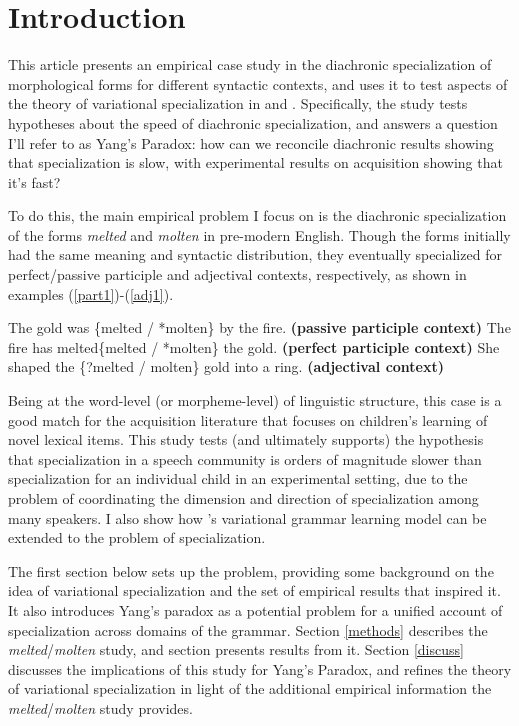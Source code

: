 \documentclass{artikel3}
\begin{document}
\section{Introduction}
\label{intro}

This article presents an empirical case study in the diachronic specialization of morphological forms for different syntactic contexts, and uses it to test aspects of the theory of variational specialization in \citet{wallenberg2016} and \citet{fruehwaldwallenberginprep}. Specifically, the study tests hypotheses about the speed of diachronic specialization, and answers a question I'll refer to as Yang's Paradox: how can we reconcile diachronic results showing that specialization is slow, with experimental results on acquisition showing that it's fast?

To do this, the main empirical problem I focus on is the diachronic specialization of the forms \textsl{melted} and \textsl{molten} in pre-modern English. Though the forms initially had the same meaning and syntactic distribution, they eventually specialized for perfect/passive participle and adjectival contexts, respectively, as shown in examples (\ref{part1})-(\ref{adj1}).

\begin{exe}
	\ex \label{part1} The gold was \{melted / *molten\} by the fire. \textbf{(passive participle context)}
	\ex \label{part2} The fire has melted\{melted / *molten\} the gold. \textbf{(perfect participle context)}
	\ex \label{adj1} She shaped the \{?melted / molten\} gold into a ring. \textbf{(adjectival context)}
\end{exe}

\noindent Being at the word-level (or morpheme-level) of linguistic structure, this case is a good match for the acquisition literature that focuses on children's learning of novel lexical items. This study tests (and ultimately supports) the hypothesis that specialization in a speech community is orders of magnitude slower than specialization for an individual child in an experimental setting, due to the problem of coordinating the dimension and direction of specialization among many speakers. I also show how \citet{yang2000}'s variational grammar learning model can be extended to the problem of specialization.

The first section below sets up the problem, providing some background on the idea of variational specialization and the set of empirical results that inspired it. It also introduces Yang's paradox as a potential problem for a unified account of specialization across domains of the grammar. Section \ref{methods} describes the \textsl{melted}/\textsl{molten} study, and section \label{results} presents results from it. Section \ref{discuss} discusses the implications of this study for Yang's Paradox, and refines the theory of variational specialization in light of the additional empirical information the \textsl{melted}/\textsl{molten} study provides.
\end{document}
